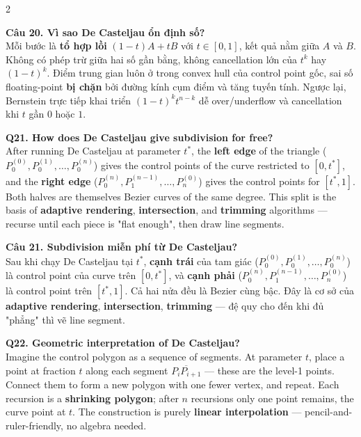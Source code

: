 \begin{paracol}{2}
\switchcolumn

\textbf{Câu 20. Vì sao De Casteljau ổn định số?}\\
Mỗi bước là \textbf{tổ hợp lồi} $(1-t)A + tB$ với $t\in[0,1]$, kết quả nằm giữa $A$ và $B$. Không có phép trừ giữa hai số gần bằng, không cancellation lớn của $t^k$ hay $(1-t)^k$. Điểm trung gian luôn ở trong convex hull của control point gốc, sai số floating-point \textbf{bị chặn} bởi đường kính cụm điểm và tăng tuyến tính. Ngược lại, Bernstein trực tiếp khai triển $(1-t)^k t^{n-k}$ dễ over/underflow và cancellation khi $t$ gần $0$ hoặc $1$.

\switchcolumn*

\textbf{Q21. How does De Casteljau give subdivision for free?}\\
After running De Casteljau at parameter $t^*$, the \textbf{left edge} of the triangle ($P_0^{(0)}, P_0^{(1)}, \ldots, P_0^{(n)}$) gives the control points of the curve restricted to $[0, t^*]$, and the \textbf{right edge} ($P_0^{(n)}, P_1^{(n-1)}, \ldots, P_n^{(0)}$) gives the control points for $[t^*, 1]$. Both halves are themselves Bezier curves of the same degree. This split is the basis of \textbf{adaptive rendering}, \textbf{intersection}, and \textbf{trimming} algorithms — recurse until each piece is "flat enough", then draw line segments.

\switchcolumn

\textbf{Câu 21. Subdivision miễn phí từ De Casteljau?}\\
Sau khi chạy De Casteljau tại $t^*$, \textbf{cạnh trái} của tam giác ($P_0^{(0)}, P_0^{(1)}, \ldots, P_0^{(n)}$) là control point của curve trên $[0, t^*]$, và \textbf{cạnh phải} ($P_0^{(n)}, P_1^{(n-1)}, \ldots, P_n^{(0)}$) là control point trên $[t^*, 1]$. Cả hai nửa đều là Bezier cùng bậc. Đây là cơ sở của \textbf{adaptive rendering}, \textbf{intersection}, \textbf{trimming} — đệ quy cho đến khi đủ "phẳng" thì vẽ line segment.

\switchcolumn*

\textbf{Q22. Geometric interpretation of De Casteljau?}\\
Imagine the control polygon as a sequence of segments. At parameter $t$, place a point at fraction $t$ along each segment $\overline{P_iP_{i+1}}$ — these are the level-1 points. Connect them to form a new polygon with one fewer vertex, and repeat. Each recursion is a \textbf{shrinking polygon}; after $n$ recursions only one point remains, the curve point at $t$. The construction is purely \textbf{linear interpolation} — pencil-and-ruler-friendly, no algebra needed.


\end{paracol}

